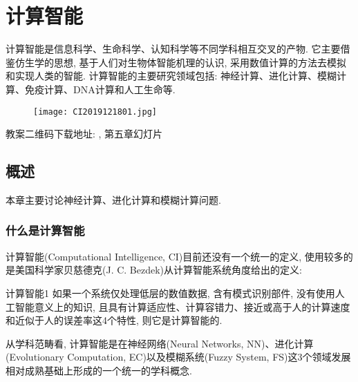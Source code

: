 \chapter{计算智能}
\begin{tcolorbox}[colback=white!50,colframe=orange!50,title=计算智能]
计算智能是信息科学、生命科学、认知科学等不同学科相互交叉的产物. 它主要借鉴仿生学的思想, 基于人们对生物体智能机理的认识, 采用数值计算的方法去模拟和实现人类的智能.
计算智能的主要研究领域包括: 神经计算、进化计算、模糊计算、免疫计算、DNA计算和人工生命等.
\hfill
\end{tcolorbox}
\begin{figure}[H]
\centering
\texttt{[image: CI2019121801.jpg]}
\label{CI2019121801}
\end{figure}
教案二维码下载地址: ,
第五章幻灯片 
\section{概述}
本章主要讨论神经计算、进化计算和模糊计算问题.
\subsection{什么是计算智能}
计算智能(Computational Intelligence, CI)目前还没有一个统一的定义, 使用较多的是美国科学家贝慈德克(J. C. Bezdek)从计算智能系统角度给出的定义:
\begin{mydef}{计算智能}{1}
    如果一个系统仅处理低层的数值数据, 含有模式识别部件, 没有使用人工智能意义上的知识, 且具有计算适应性、计算容错力、接近或高于人的计算速度和近似于人的误差率这4个特性, 则它是计算智能的.
\end{mydef}
\begin{remark}
    从学科范畴看, 计算智能是在神经网络(Neural Networks, NN)、进化计算(Evolutionary Computation, EC)以及模糊系统(Fuzzy System, FS)这3个领域发展相对成熟基础上形成的一个统一的学科概念.
\end{remark}

